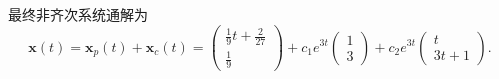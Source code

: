 \begin{questions}
\begin{solution}
\[        \]
        最终非齐次系统通解为
        \[
        \boldsymbol{x}(t) = \boldsymbol{x}_p(t) + \boldsymbol{x}_c(t) = \begin{pmatrix} \frac{1}{9} t + \frac{2}{27} \\ \frac{1}{9} \end{pmatrix} + c_1 e^{3t} \begin{pmatrix} 1 \\ 3 \end{pmatrix} + c_2 e^{3t} \begin{pmatrix} t \\ 3t+1 \end{pmatrix}.
        \]
    \end{solution}



\end{questions}
